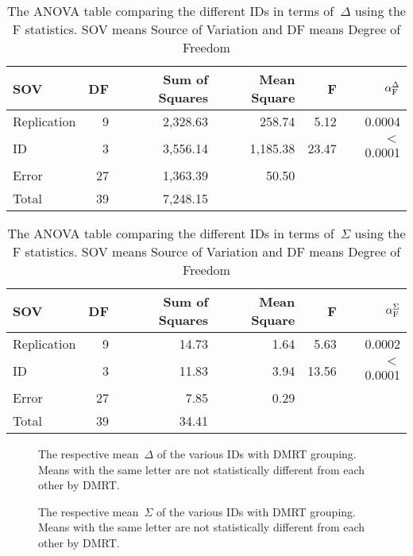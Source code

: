 \documentclass[preprint]{./acm_proc_article-sp}
\begin{document}
\begin{table*}[bth]
\caption{The ANOVA table comparing the different IDs in terms of~$\Delta$ using the F statistics. SOV means Source of Variation and DF means Degree of Freedom}\label{tab:anova-delay}
\centering\begin{tabular}{lrrrrr}
\hline\hline
SOV & DF & Sum of Squares & Mean Square & F & $\alpha_{\rm F}^{\Delta}$\\
\hline
Replication            &  9 & 2,328.63 &   258.74 &  5.12 & 0.0004 \\
ID                     &  3 & 3,556.14 & 1,185.38 & 23.47 & $<$ 0.0001 \\
Error                  & 27 & 1,363.39 &    50.50 & \\
\hline
Total                  & 39 & 7,248.15 & \\
\hline\hline
\end{tabular}
\end{table*}

\begin{table*}[bth]
\caption{The ANOVA table comparing the different IDs in terms of~$\Sigma$ using the F statistics. SOV means Source of Variation and DF means Degree of Freedom}\label{tab:anova-speed}
\centering\begin{tabular}{lrrrrr}
\hline\hline
SOV & DF & Sum of Squares & Mean Square & F & $\alpha_{\rm F}^{\Sigma}$\\
\hline
Replication            &  9 & 14.73 & 1.64 &  5.63 & 0.0002 \\
ID                     &  3 & 11.83 & 3.94 & 13.56 & $<$ 0.0001 \\
Error                  & 27 &  7.85 & 0.29 & \\
\hline
Total                  & 39 & 34.41 & \\
\hline\hline
\end{tabular}
\end{table*}

\begin{figure}[bth]
\centering{}
\caption{The respective mean~$\Delta$ of the various IDs with DMRT grouping. Means with the same letter are not statistically different from each other by DMRT.}\label{fig:dmrt1}
\end{figure}

\begin{figure}[bth]
\centering{}
\caption{The respective mean~$\Sigma$ of the various IDs with DMRT grouping. Means with the same letter are not statistically different from each other by DMRT.}\label{fig:dmrt2}
\end{figure}
\end{document}

